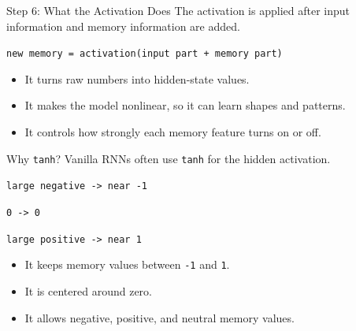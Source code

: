 \documentclass{beamer}
\begin{document}
\begin{frame}{Step 6: What the Activation Does}
\small
The activation is applied after input information and memory information are added.

\vspace{0.2cm}

\begin{center}
\texttt{new memory = activation(input part + memory part)}
\end{center}

\vspace{0.2cm}

\begin{itemize}
    \item It turns raw numbers into hidden-state values.
    \item It makes the model nonlinear, so it can learn shapes and patterns.
    \item It controls how strongly each memory feature turns on or off.
\end{itemize}
\end{frame}

\begin{frame}{Why \texttt{tanh}?}
\small
Vanilla RNNs often use \texttt{tanh} for the hidden activation.

\vspace{0.2cm}

\begin{center}
\texttt{large negative -> near -1}

\texttt{0 -> 0}

\texttt{large positive -> near 1}
\end{center}

\vspace{0.2cm}

\begin{itemize}
    \item It keeps memory values between \texttt{-1} and \texttt{1}.
    \item It is centered around zero.
    \item It allows negative, positive, and neutral memory values.
\end{itemize}
\end{frame}
\end{document}
